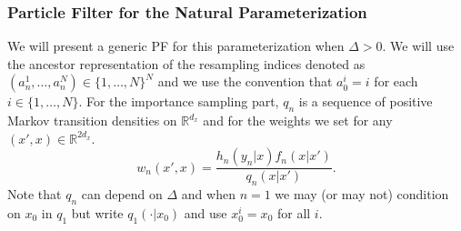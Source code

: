 \documentclass[english,13pt]{article}
\numberwithin{equation}{section}
\begin{document}


\subsubsection{Particle Filter for the Natural Parameterization}

We will present a generic PF for this parameterization when $\Delta>0$.  We will use the ancestor representation of the resampling indices denoted as $({a}_n^1,\dots,{a}_n^N)\in\{1,\dots,N\}^N$ and we use the convention that ${a}_0^i=i$ for each $i\in\{1,\dots,N\}$.  %
For the importance sampling part, $q_n$ is a sequence of positive Markov transition densities on $\mathbb{R}^{d_x}$ and for the weights we set for any $(x',x)\in\mathbb{R}^{2d_x}$. 
$$
w_n(x',x) = \frac{h_n(y_n|x)f_n(x|x')}{q_n(x|x')}.
$$
Note that ${q}_n$ can depend on $\Delta$ and when $n=1$ we may (or may not) condition on $x_0$
in ${q}_1$ but write ${q}_1(\cdot|x_0)$ and use $x_0^i=x_0$ for all $i$.
\end{document}
